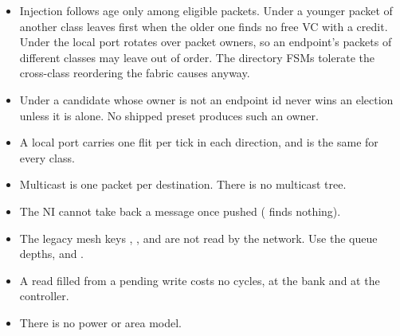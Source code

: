 \begin{itemize}
  , which has one path per pair, and a  by  or
  . There is no adaptive or non-minimal routing on either.
\item Injection follows age only among eligible packets. Under  a younger packet
  of another class leaves first when the older one finds no free VC with a credit. Under
   the local port rotates over packet owners, so an endpoint's packets of different
  classes may leave out of order. The directory FSMs tolerate the cross-class reordering the fabric
  causes anyway.
\item Under  a candidate whose owner is not an endpoint id never wins an election
  unless it is alone. No shipped preset produces such an owner.
\item A local port carries one flit per tick in each direction, and  is the same
  for every class.
\item Multicast is one packet per destination. There is no multicast tree.
\item The NI cannot take back a message once pushed ( finds nothing).
\item The legacy mesh keys , ,
   and  are not read by the network. Use the queue depths, 
  and .
\item A read filled from a pending write costs no cycles, at the bank and at the controller.
\item There is no power or area model.
\end{itemize}


